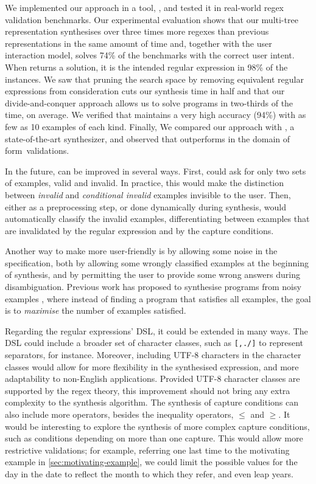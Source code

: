 We implemented our approach in a tool, \Forest{}, and tested it in real-world regex validation benchmarks. Our experimental evaluation shows that our multi-tree representation synthesises over three times more regexes than previous representations in the same amount of time and, together with the user interaction model, \Forest{} solves 74\% of the benchmarks with the correct user intent. When \Forest{} returns a solution, it is the intended regular expression in 98\% of the instances.
%
We saw that pruning the search space by removing equivalent regular expressions from consideration cuts our synthesis time in half and that our divide-and-conquer approach allows us to solve programs in two-thirds of the time, on average.
%
We verified that \Forest{} maintains a very high accuracy (94\%) with
as few as 10 examples of each kind.
Finally, We compared our approach with \Regel{}, a state-of-the-art synthesizer, and observed that \Forest outperforms \Regel in the domain of form~validations.

In the future, \Forest{} can be improved in several ways. First, \Forest could ask for only two sets of examples, valid and invalid. In practice, this would make the distinction between \textit{invalid} and \textit{conditional invalid} examples invisible to the user.
Then, either as a preprocessing step, or done dynamically during synthesis, \Forest would automatically classify the invalid examples, differentiating between examples that are invalidated by the regular expression and by the capture conditions.

Another way to make \Forest more user-friendly is by allowing some noise in the specification, both by allowing some wrongly classified examples at the beginning of synthesis, and by permitting the user to provide some wrong answers during disambiguation. Previous work has proposed to synthesise programs from noisy examples \cite{DanielThesis,ecoop/Peleg20,DBLP:conf/cav/AlmagorK20}, where instead of finding a program that satisfies all examples, the goal is to \textit{maximise} the number of examples satisfied.

Regarding the regular expressions' \ac{DSL}, it could be extended in many ways. The \ac{DSL} could include a broader set of character classes, such as \verb`[,./]` to represent separators, for instance. Moreover, including UTF-8 characters in the character classes would allow for more flexibility in the synthesised expression, and more adaptability to non-English applications. Provided UTF-8 character classes are supported by the regex theory, this improvement should not bring any extra complexity to the synthesis algorithm.
%
The synthesis of capture conditions can also include more operators, besides the inequality operators, \(\le\) and \(\ge\). It would be interesting to explore the synthesis of more complex capture conditions, such as conditions depending on more than one capture. This would allow more restrictive validations; for example, referring one last time to the motivating example in \autoref{sec:motivating-example}, we could limit the possible values for the day in the date to reflect the month to which they refer, and even leap years.

